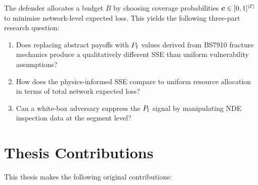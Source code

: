 The defender allocates a budget $B$ by choosing coverage probabilities
$\bm{c} \in [0,1]^{|\mathcal{E}|}$ to minimise network-level expected loss.
This yields the following three-part research question:

\begin{enumerate}
  \item Does replacing abstract payoffs with $P_{\mathrm{f}}$ values derived from
    \acs{BS7910} fracture mechanics produce a qualitatively different
    \ac{SSE} than uniform vulnerability assumptions?
  \item How does the physics-informed \ac{SSE} compare to uniform
    resource allocation in terms of total network expected loss?
  \item Can a white-box adversary suppress the $P_{\mathrm{f}}$ signal by
    manipulating \ac{NDE} inspection data at the segment level?
\end{enumerate}

\section{Thesis Contributions}
\label{sec:intro_contributions}

This thesis makes the following original contributions:

